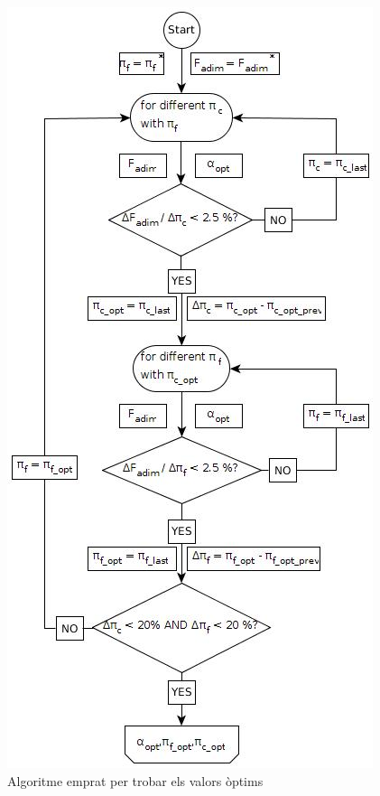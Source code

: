 \begin{figure}[H]
	\centering
	\includegraphics[scale=0.6]{./pics/optimization}
	\caption{Algoritme emprat per trobar els valors òptims}
	\label{opt}
\end{figure}

